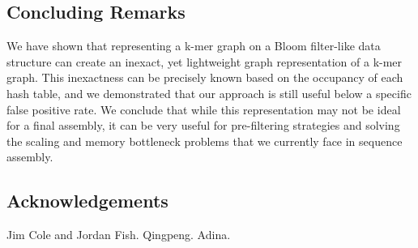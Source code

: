 \documentclass[12pt]{article} \usepackage{simplemargins}
\begin{document}
\subsection{Concluding Remarks}
We have shown that representing a k-mer graph on a Bloom filter-like data 
structure can create an inexact, yet lightweight graph representation of 
a k-mer graph. This inexactness can be precisely known based on the occupancy 
of each hash table, and we demonstrated that our approach is still useful 
below a specific false positive rate. We conclude that while this representation 
may not be ideal for a final assembly, it can be very useful for pre-filtering 
strategies and solving the scaling and memory bottleneck problems that we 
currently face in sequence assembly.

\subsection{Acknowledgements}

Jim Cole and Jordan Fish.  Qingpeng.  Adina.



\end{document}
